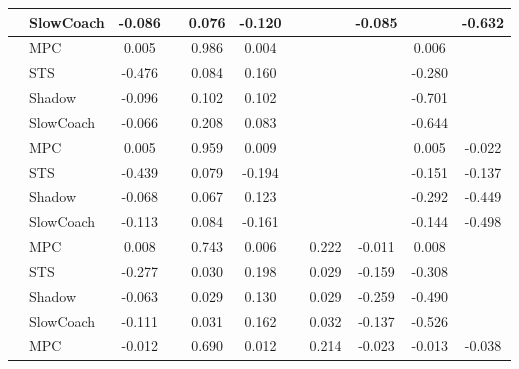 \begin{tabular}{|l|l|*{9}{c|}}
                                                           & SlowCoach &   -0.086 &        &     0.076 & -0.120 &     &     &  -0.085 &      &   -0.632 \\
\midrule
[True, False, True, True, False, False, False, True, False] & MPC &    0.005 &        &     0.986 &  0.004 &     &     &      &   0.006 &       \\
                                                           & STS &   -0.476 &        &     0.084 &  0.160 &     &     &      &  -0.280 &       \\
                                                           & Shadow &   -0.096 &        &     0.102 &  0.102 &     &     &      &  -0.701 &       \\
                                                           & SlowCoach &   -0.066 &        &     0.208 &  0.083 &     &     &      &  -0.644 &       \\
\midrule
[True, False, True, True, False, False, False, True, True] & MPC &    0.005 &        &     0.959 &  0.009 &     &     &      &   0.005 &   -0.022 \\
                                                           & STS &   -0.439 &        &     0.079 & -0.194 &     &     &      &  -0.151 &   -0.137 \\
                                                           & Shadow &   -0.068 &        &     0.067 &  0.123 &     &     &      &  -0.292 &   -0.449 \\
                                                           & SlowCoach &   -0.113 &        &     0.084 & -0.161 &     &     &      &  -0.144 &   -0.498 \\
\midrule
[True, False, True, True, False, True, True, True, False] & MPC &    0.008 &        &     0.743 &  0.006 &     &  0.222 &  -0.011 &   0.008 &       \\
                                                           & STS &   -0.277 &        &     0.030 &  0.198 &     &  0.029 &  -0.159 &  -0.308 &       \\
                                                           & Shadow &   -0.063 &        &     0.029 &  0.130 &     &  0.029 &  -0.259 &  -0.490 &       \\
                                                           & SlowCoach &   -0.111 &        &     0.031 &  0.162 &     &  0.032 &  -0.137 &  -0.526 &       \\
\midrule
[True, False, True, True, False, True, True, True, True] & MPC &   -0.012 &        &     0.690 &  0.012 &     &  0.214 &  -0.023 &  -0.013 &   -0.038 \\

\end{tabular}

